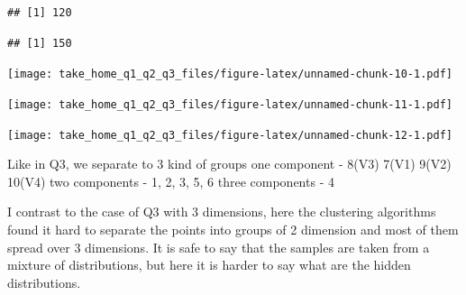\documentclass[
]{article}
\begin{document}
\begin{verbatim}
## [1] 120
\end{verbatim}

\begin{verbatim}
## [1] 150
\end{verbatim}

\texttt{[image: take\_home\_q1\_q2\_q3\_files/figure-latex/unnamed-chunk-10-1.pdf]}

\texttt{[image: take\_home\_q1\_q2\_q3\_files/figure-latex/unnamed-chunk-11-1.pdf]}

\texttt{[image: take\_home\_q1\_q2\_q3\_files/figure-latex/unnamed-chunk-12-1.pdf]}

Like in Q3, we separate to 3 kind of groups one component - 8(V3) 7(V1)
9(V2) 10(V4) two components - 1, 2, 3, 5, 6 three components - 4

I contrast to the case of Q3 with 3 dimensions, here the clustering
algorithms found it hard to separate the points into groups of 2
dimension and most of them spread over 3 dimensions. It is safe to say
that the samples are taken from a mixture of distributions, but here it
is harder to say what are the hidden distributions.
\end{document}
